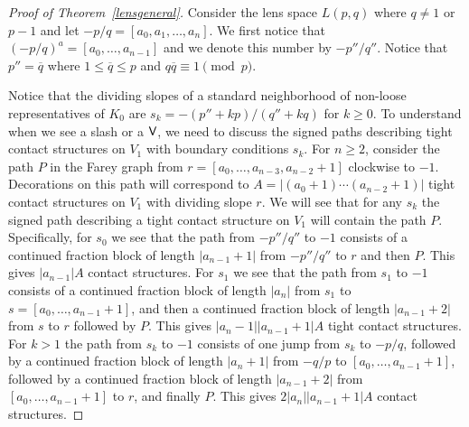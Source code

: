 \documentclass[11pt]{amsart}
\theoremstyle{plain}
\theoremstyle{definition}
\theoremstyle{remark}
\numberwithin{theorem}{section}
\begin{document}
\begin{proof}[Proof of Theorem~\ref{lensgeneral}]
Consider the lens space $L(p,q)$ where $q\not= 1$ or $p-1$ and let $-p/q=[a_0,a_1, \ldots, a_n]$. We first notice that $(-p/q)^a=[a_0,\ldots, a_{n-1}]$ and we denote this number by $-p''/q''$. Notice that $p'' = \overline{q}$ where $1 \leq \overline{q} \leq p$ and $q\overline{q} \equiv 1 \pmod p$. 

Notice that the dividing slopes of a standard neighborhood of non-loose representatives of $K_0$ are $s_k=-(p''+kp)/(q''+kq)$ for $k \geq 0$. To understand when we see a slash or a $\normalfont\textsf{V}$, we need to discuss the signed paths describing tight contact structures on $V_1$ with boundary conditions $s_k$. For $n \geq 2$, consider the path $P$ in the Farey graph from $r=[a_0,\ldots, a_{n-3}, a_{n-2}+1]$ clockwise to $-1$. Decorations on this path will correspond to $A=|(a_0+1)\cdots (a_{n-2}+1)|$ tight contact structures on $V_1$ with dividing slope $r$. We will see that for any $s_k$ the signed path describing a tight contact structure on $V_1$ will contain the path $P$. Specifically, for $s_0$ we see that the path from $-p''/q''$ to $-1$ consists of a continued fraction block of length $|a_{n-1}+1|$ from $-p''/q''$ to $r$ and then $P$. This gives $|a_{n-1}|A$ contact structures.  For $s_1$ we see that the path from $s_1$ to $-1$ consists of a continued fraction block of length $|a_n|$ from $s_1$ to $s = [a_0,\ldots, a_{n-1}+1]$, and then a continued fraction block of length $|a_{n-1}+2|$ from $s$ to $r$ followed by $P$. This gives $|a_n-1||a_{n-1}+1|A$ tight contact structures. For $k>1$ the path from $s_k$ to $-1$ consists of one jump from $s_k$ to $-p/q$, followed by a continued fraction block of length $|a_n+1|$ from $-q/p$ to $[a_0,\ldots, a_{n-1}+1]$, followed by a continued fraction block of length $|a_{n-1}+2|$ from $[a_0,\ldots, a_{n-1}+1]$ to $r$, and finally $P$. This gives $2|a_n||a_{n-1}+1|A$ contact structures. 


\end{proof}
\end{document}
